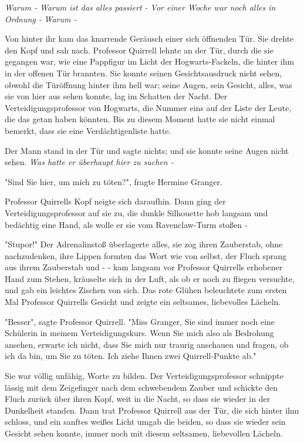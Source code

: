{\emph{Warum - Warum ist das alles passiert - Vor einer Woche war noch alles in Ordnung -} \emph{Warum -}

Von hinter ihr kam das knarrende Geräusch einer sich öffnenden Tür. Sie drehte den Kopf und sah nach. Professor Quirrell lehnte an der Tür, durch die sie gegangen war, wie eine Pappfigur im Licht der Hogwarts-Fackeln, die hinter ihm in der offenen Tür brannten. Sie konnte seinen Gesichtsausdruck nicht sehen, obwohl die Türöffnung hinter ihm hell war; seine Augen, sein Gesicht, alles, was sie von hier aus sehen konnte, lag im Schatten der Nacht. Der Verteidigungsprofessor von Hogwarts, die Nummer eins auf der Liste der Leute, die das getan haben könnten. Bis zu diesem Moment hatte sie nicht einmal bemerkt, dass sie eine Verdächtigenliste hatte.

Der Mann stand in der Tür und sagte nichts; und sie konnte seine Augen nicht sehen. \emph{Was hatte er überhaupt hier zu suchen -}

"Sind Sie hier, um mich zu töten?", fragte Hermine Granger.

Professor Quirrells Kopf neigte sich daraufhin. Dann ging der Verteidigungsprofessor auf sie zu, die dunkle Silhouette hob langsam und bedächtig eine Hand, als wolle er sie vom Ravenclaw-Turm stoßen -

"Stupor!" Der Adrenalinstoß überlagerte alles, sie zog ihren Zauberstab, ohne nachzudenken, ihre Lippen formten das Wort wie von selbst, der Fluch sprang aus ihrem Zauberstab und - - kam langsam vor Professor Quirrells erhobener Hand zum Stehen, kräuselte sich in der Luft, als ob er noch zu fliegen versuchte, und gab ein leichtes Zischen von sich. Das rote Glühen beleuchtete zum ersten Mal Professor Quirrells Gesicht und zeigte ein seltsames, liebevolles Lächeln.

"Besser", sagte Professor Quirrell. "Miss Granger, Sie sind immer noch eine Schülerin in meinem Verteidigungskurs. Wenn Sie mich also als Bedrohung ansehen, erwarte ich nicht, dass Sie mich nur traurig anschauen und fragen, ob ich da bin, um Sie zu töten. Ich ziehe Ihnen zwei Quirrell-Punkte ab."

Sie war völlig unfähig, Worte zu bilden. Der Verteidigungsprofessor schnippte lässig mit dem Zeigefinger nach dem schwebendem Zauber und schickte den Fluch zurück über ihren Kopf, weit in die Nacht, so dass sie wieder in der Dunkelheit standen. Dann trat Professor Quirrell aus der Tür, die sich hinter ihm schloss, und ein sanftes weißes Licht umgab die beiden, so dass sie wieder sein Gesicht sehen konnte, immer noch mit diesem seltsamen, liebevollen Lächeln.

}

